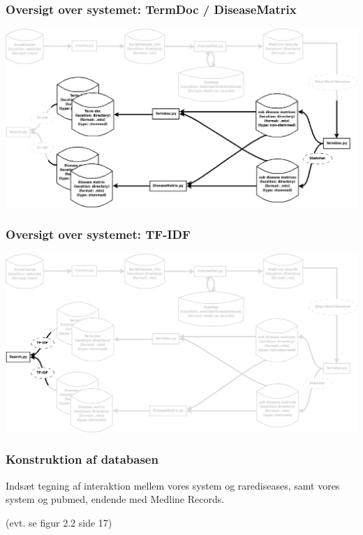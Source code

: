 \documentclass[xcolor=table]{beamer}
\begin{document}
\begin{frame}

  \frametitle{Oversigt over systemet: TermDoc / DiseaseMatrix}

  \begin{center}
    \includegraphics[width=1.0\textwidth]{system_overview4}
  \end{center}
  
\end{frame}
\begin{frame}

  \frametitle{Oversigt over systemet: TF-IDF}

  \begin{center}
    \includegraphics[width=1.0\textwidth]{system_overview5}
  \end{center}
  
\end{frame}

\begin{frame}

  \frametitle{Konstruktion af databasen}

  Inds\ae t tegning af interaktion mellem vores system og rarediseases, samt vores system og pubmed, endende med Medline Records.

  (evt. se figur 2.2 side 17)

\end{frame}
\end{document}
